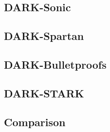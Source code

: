 \documentclass{article}
\begin{document}
\subsection{DARK-Sonic}

\subsection{DARK-Spartan}

\subsection{DARK-Bulletproofs}

\subsection{DARK-STARK}

\subsection{Comparison}
\end{document}
